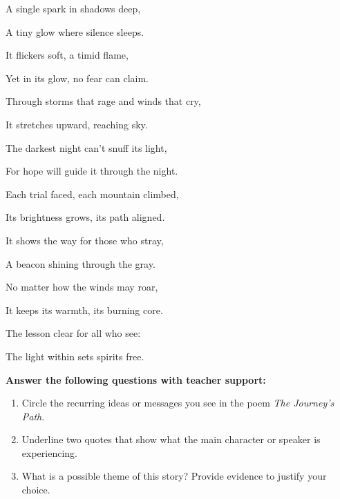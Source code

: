 \documentclass[12pt]{article}
\begin{document}
\begin{tcolorbox}[colframe=black!60, colback=white, 
coltitle=black, colbacktitle=black!15, fonttitle=\bfseries\Large, 
title=Text: \textit{The Journey's Path}, halign title=center, left=10pt, right=10pt, top=10pt, bottom=15pt]

A single spark in shadows deep,

A tiny glow where silence sleeps.

It flickers soft, a timid flame,

Yet in its glow, no fear can claim.

Through storms that rage and winds that cry,

It stretches upward, reaching sky.

The darkest night can’t snuff its light,

For hope will guide it through the night.

Each trial faced, each mountain climbed,

Its brightness grows, its path aligned.

It shows the way for those who stray,

A beacon shining through the gray.

No matter how the winds may roar,

It keeps its warmth, its burning core.

The lesson clear for all who see:

The light within sets spirits free.

 

\end{tcolorbox}

\vspace{1em}
\begin{tcolorbox}[colframe=black!60, colback=white, 
coltitle=black, colbacktitle=black!15, fonttitle=\bfseries\Large, 
title=Guided Practice, halign title=center, left=10pt, right=10pt, top=10pt, bottom=15pt]



\textbf{Answer the following questions with teacher support:}
\begin{enumerate}[itemsep=1em]
    \item Circle the recurring ideas or messages you see in the poem \textit{The Journey's Path}.
    \item Underline two quotes that show what the main character or speaker is experiencing.
    \item What is a possible theme of this story? Provide evidence to justify your choice.
\vspace{7em}
\end{enumerate}
\end{tcolorbox}
\end{document}
